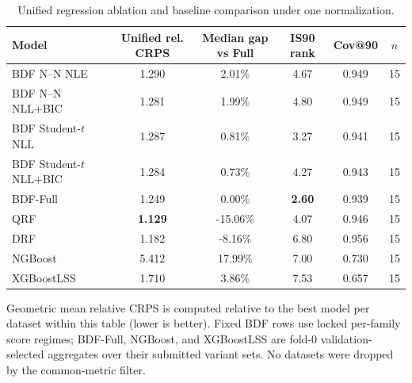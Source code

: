 \begin{table}[htbp]
\centering
\caption{Unified regression ablation and baseline comparison under one normalization.}
\label{tab:bdf-unified-ablation}
\begin{tabular}{lccccc}
\toprule
Model & Unified rel. CRPS & Median gap vs Full & IS90 rank & Cov@90 & $n$ \\
\midrule
BDF N--N NLE & 1.290 & 2.01\% & 4.67 & 0.949 & 15 \\
BDF N--N NLL+BIC & 1.281 & 1.99\% & 4.80 & 0.949 & 15 \\
BDF Student-$t$ NLL & 1.287 & 0.81\% & 3.27 & 0.941 & 15 \\
BDF Student-$t$ NLL+BIC & 1.284 & 0.73\% & 4.27 & 0.943 & 15 \\
BDF-Full & 1.249 & 0.00\% & \textbf{2.60} & 0.939 & 15 \\
QRF & \textbf{1.129} & -15.06\% & 4.07 & 0.946 & 15 \\
DRF & 1.182 & -8.16\% & 6.80 & 0.956 & 15 \\
NGBoost & 5.412 & 17.99\% & 7.00 & 0.730 & 15 \\
XGBoostLSS & 1.710 & 3.86\% & 7.53 & 0.657 & 15 \\
\bottomrule
\end{tabular}
\par\smallskip\footnotesize{Geometric mean relative CRPS is computed relative to the best model per dataset within this table (lower is better). Fixed BDF rows use locked per-family score regimes; BDF-Full, NGBoost, and XGBoostLSS are fold-0 validation-selected aggregates over their submitted variant sets. No datasets were dropped by the common-metric filter.}
\end{table}
